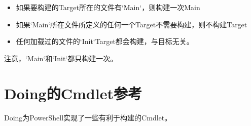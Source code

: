 \begin{itemize}
	\item 如果要构建的Target所在的文件有`Main`，则构建一次Main
	\item 如果`Main`所在文件所定义的任何一个Target不需要构建，则不构建Target
	\item 任何加载过的文件的`Init`Target都会构建，与目标无关。
\end{itemize}
注意，`Main`和`Init`都只构建一次。



\section{Doing的Cmdlet参考}
Doing为PowerShell实现了一些有利于构建的Cmdlet。










